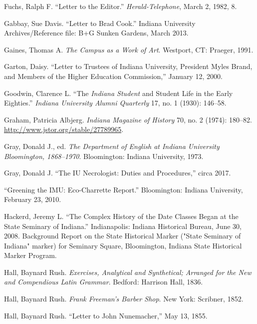 \documentclass[
  american,
  letterpaper,
]{scrreprt}
\newlength{\cslhangindent}
\newenvironment{CSLReferences}[2] %
 {\begin{list}{}{%
  \setlength{\itemindent}{0pt}
  \setlength{\leftmargin}{0pt}
  \setlength{\parsep}{0pt}
  \ifodd #1
   \setlength{\leftmargin}{\cslhangindent}
   \setlength{\itemindent}{-1\cslhangindent}
  \fi
  \setlength{\itemsep}{#2\baselineskip}}}
 {\end{list}}
\begin{document}
\begin{CSLReferences}{1}{0}
Fuchs, Ralph F. {``Letter to the Editor.''} \emph{Herald-Telephone},
March 2, 1982, 8.

Gabbay, Sue Davis. {``Letter to Brad Cook.''} Indiana University
Archives/Reference file: B+G Sunken Gardens, March 2013.

Gaines, Thomas A. \emph{The Campus as a Work of Art}. Westport, CT:
Praeger, 1991.

Garton, Daisy. {``Letter to Trustees of Indiana University, President
Myles Brand, and Members of the Higher Education Commission,''} January
12, 2000.

Goodwin, Clarence L. {``The \emph{Indiana Student} and Student Life in
the Early Eighties.''} \emph{Indiana University Alumni Quarterly} 17,
no. 1 (1930): 146--58.

Graham, Patricia Albjerg. \emph{Indiana Magazine of History} 70, no. 2
(1974): 180--82. \url{http://www.jstor.org/stable/27789965}.

Gray, Donald J., ed. \emph{The Department of English at Indiana
University Bloomington, 1868--1970}. Bloomington: Indiana University,
1973.

Gray, Donald J. {``The IU Necrologist: Duties and Procedures,''} circa
2017.

{``Greening the IMU: Eco-Charrette Report.''} Bloomington: Indiana
University, February 23, 2010.

Hackerd, Jeremy L. {``The Complex History of the Date Classes Began at
the State Seminary of Indiana.''} Indianapolis: Indiana Historical
Bureau, June 30, 2008. Background Report on the State Historical Marker
("State Seminary of Indiana" marker) for Seminary Square, Bloomington,
Indiana State Historical Marker Program.

Hall, Baynard Rush. \emph{Exercises, Analytical and Synthetical;
Arranged for the New and Compendious Latin Grammar}. Bedford: Harrison
Hall, 1836.

Hall, Baynard Rush. \emph{Frank Freeman's Barber Shop}. New York:
Scribner, 1852.

Hall, Baynard Rush. {``Letter to John Nunemacher,''} May 13, 1855.


\end{CSLReferences}
\end{document}
